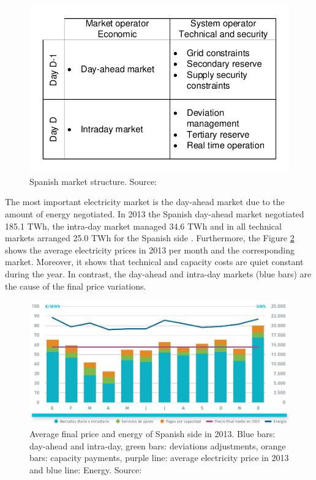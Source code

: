 \documentclass[a4paper,11pt,twoside,openright]{report}
\begin{document}
\begin{figure}[h!]
	\centering
	\includegraphics[scale=0.7]{Visios/Spanish_market_structure}
	\caption{Spanish market structure. Source: }
	\label{fig:Spain_structure}
\end{figure}

The most important electricity market is the day-ahead market due to the amount of energy negotiated. 
In 2013 the Spanish day-ahead market negotiated 185.1 TWh, the intra-day market managed 34.6 TWh and in all technical markets arranged 25.0 TWh for the Spanish side \cite{REE_2013}. 
Furthermore, the  Figure \ref{fig:price2013} shows the average electricity prices in 2013 per month and the corresponding market. 
Moreover, it shows that technical and capacity costs are quiet constant during the year. In contrast, the day-ahead and intra-day markets (blue bars) are the cause of the final price variations.

\begin{figure}[h!]
	\centering
	\includegraphics[scale=0.54]{figures/Captura_preu_final_REE_2013}
	\caption{Average final price and energy of Spanish side in 2013. Blue bars: day-ahead and intra-day, green bars: deviations adjustments, orange bars: capacity payments, purple line: average electricity price in 2013 and blue line: Energy. Source: \cite{REE_2013}}	
	\label{fig:price2013}
	
\end{figure}
\end{document}
